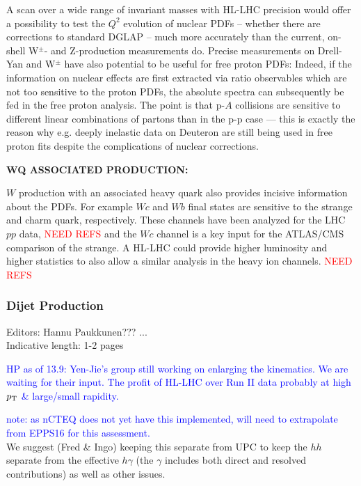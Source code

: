 \documentclass[../report.tex]{subfiles}
\begin{document}
A scan over a wide range of invariant masses
with HL-LHC precision would offer a possibility to test the $Q^2$ evolution of
nuclear PDFs -- whether there are corrections to standard DGLAP -- much more accurately than the current, on-shell W$^\pm$- and Z-production measurements do.
Precise measurements on Drell-Yan and W$^\pm$ have also potential to be useful for 
free proton PDFs: Indeed, if the information on nuclear effects are first extracted
via ratio observables which are not too sensitive to the proton PDFs, the absolute 
spectra can subsequently be fed in the free proton analysis. The point is that p-$A$
collisions are sensitive to different linear combinations of partons than in the p-p
case --- this is exactly the reason why e.g. deeply inelastic data on Deuteron are
still being used in free proton fits despite the complications of nuclear corrections. 



{\bf WQ ASSOCIATED PRODUCTION:}


$W$ production with an associated heavy quark also provides incisive information 
about the PDFs. For example $Wc$ and $Wb$ final states are sensitive to the strange and charm quark, respectively. 
These channels have been analyzed for the LHC $pp$ data, \textcolor{red}{NEED REFS}
and the $Wc$ channel is a key input for the ATLAS/CMS comparison of the strange.\cite{Cooper-Sarkar:2018ufj}
A HL-LHC could provide   higher luminosity and higher statistics to 
also allow  a similar analysis in the heavy  ion channels. \textcolor{red}{NEED REFS}




\subsubsection{Dijet Production}

Editors: Hannu Paukkunen??? ... \\
Indicative length: 1-2 pages 

\textcolor{blue}{HP as of 13.9: Yen-Jie's group still working on enlarging the kinematics. We are waiting for their input. The profit of HL-LHC over Run II data probably at high $p_{\rm T}$ \& large/small rapidity.}

\noindent
\textcolor{blue}{note: as nCTEQ does not yet have this implemented,
will need to extrapolate from EPPS16\cite{Eskola:2016oht} for this assessment.}
\\
We suggest (Fred \& Ingo) keeping this separate from UPC 
to keep the $hh$ separate from the effective $h \gamma$ 
(the $\gamma$ includes both direct and resolved contributions) as well as other issues.
\end{document}
